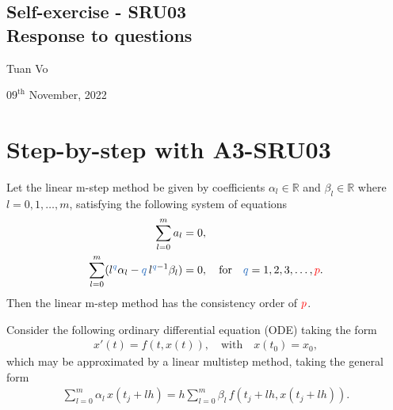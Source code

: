 \documentclass[12pt]{article}
\begin{document}
\begin{center}
	\section*{Self-exercise - SRU03\\ Response to questions}
\end{center}
\begin{center}
	Tuan Vo
\end{center}
\begin{center}
	$09^{\text{th}}$ November, 2022
\end{center}
\section{Step-by-step with A3-SRU03}
\begin{exampleboxed}
	Let the linear m-step method be given by coefficients 
	$\alpha_{l} \in \mathbb{R}$ and 
	$\beta_{l} \in \mathbb{R}$ where $l=0,1,\dots,m$, 
	satisfying the following system of equations 
	\begin{align}
		\sum_{l=0}^{m}a_{l}                                                                                                   & = 0, 
		\label{eq:alphal}
		\\
		\sum_{l=0}^{m}(l^{\textcolor{NavyBlue}{q}}\alpha_{l}-\textcolor{NavyBlue}{q}\,l^{\textcolor{NavyBlue}{q}-1}\beta_{l}) & = 0,
		\quad\text{for}\quad
		\textcolor{NavyBlue}{q} = 1,2,3,\dots, \textcolor{red}{p}.
		\label{eq:betal}
	\end{align}
	Then the linear m-step method has the consistency order of $\textcolor{red}{p}$.
\end{exampleboxed}
Consider the following ordinary differential equation (ODE) taking the form
\begin{align}
	\label{eq:thisistheODE}
	x'(t) =  f(t,x(t)),
	\quad\text{with}\quad
	x(t_0)=x_0,
\end{align}
which may be approximated by a linear multistep method, taking the general form
\begin{align}
	\label{eq:multistepform}
	\boxed{
	\sum_{l=0}^{{m}}\alpha_l\,x(t_j+lh) = h\sum_{l=0}^{m}\beta_l\,f(t_j+lh,x(t_j+lh)).
	}
\end{align}
\end{document}
